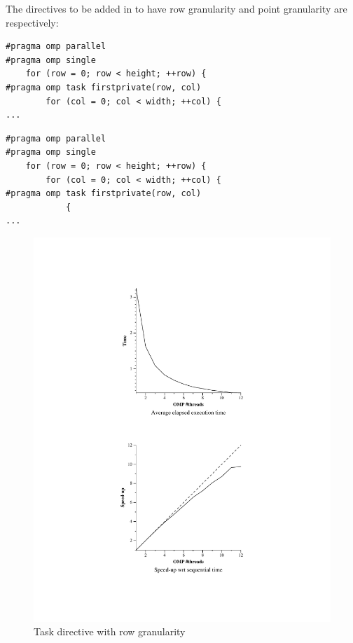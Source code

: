 \documentclass[11pt]{article}
\begin{document}
The directives to be added in to have row granularity and point granularity are respectively:
\begin{verbatim}
#pragma omp parallel
#pragma omp single
    for (row = 0; row < height; ++row) {
#pragma omp task firstprivate(row, col)
        for (col = 0; col < width; ++col) {
...
\end{verbatim}
\begin{verbatim}
#pragma omp parallel
#pragma omp single
    for (row = 0; row < height; ++row) {
        for (col = 0; col < width; ++col) {
#pragma omp task firstprivate(row, col)
            { 
...
\end{verbatim}
\begin{figure}[!htb]
  \begin{minipage}[t]{0.48\textwidth}
    \centerline{\includegraphics[width=1.5\linewidth]{./Task/row/row.pdf}}
    \caption{Task directive with row granularity}
  \end{minipage}
  \begin{minipage}[t]{0.48\textwidth}

\end{minipage}
\end{figure}
\end{document}

